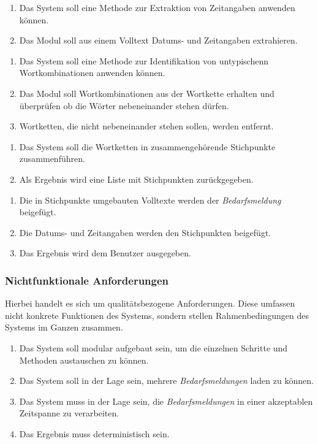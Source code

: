 \begin{enumerate}[label=5.\arabic*]
	\item Das System soll eine Methode zur Extraktion von Zeitangaben anwenden können.
	\item Das Modul soll aus einem Volltext Datums- und Zeitangaben extrahieren.
\end{enumerate}
\begin{enumerate}[label=6.\arabic*]
	\item Das System soll eine Methode zur Identifikation von untypischenn Wortkombinationen anwenden können.
	\item Das Modul soll Wortkombinationen aus der Wortkette erhalten und überprüfen ob die Wörter nebeneinander stehen dürfen.
	\item Wortketten, die nicht nebeneinander stehen sollen, werden entfernt.
\end{enumerate}
\begin{enumerate}[label=7.\arabic*]
	\item Das System soll die Wortketten in zusammengehörende Stichpunkte zusammenführen.
	\item Als Ergebnis wird eine Liste mit Stichpunkten zurückgegeben.
\end{enumerate}
\begin{enumerate}[label=8.\arabic*]
	\item Die in Stichpunkte umgebauten Volltexte werden der \emph{Bedarfsmeldung} beigefügt.
	\item Die Datums- und Zeitangaben werden den Stichpunkten beigefügt.
	\item Das Ergebnis wird dem Benutzer ausgegeben.
\end{enumerate}
\subsubsection{Nichtfunktionale Anforderungen}
Hierbei handelt es sich um qualitätsbezogene Anforderungen. Diese umfassen nicht konkrete Funktionen des Systems, sondern stellen Rahmenbedingungen des Systems im Ganzen zusammen.
\begin{enumerate}
	\item Das System soll modular aufgebaut sein, um die einzelnen Schritte und Methoden austauschen zu können.
	\item Das System soll in der Lage sein, mehrere \emph{Bedarfsmeldungen} laden zu können.
	\item Das System muss in der Lage sein, die \emph{Bedarfsmeldungen} in einer akzeptablen Zeitspanne zu verarbeiten.
	\item Das Ergebnis muss deterministisch sein.
\end{enumerate}
